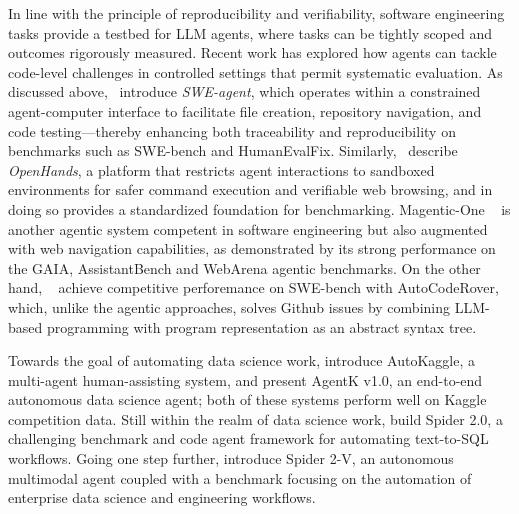 



In line with the principle of reproducibility and verifiability, software engineering tasks provide a testbed for LLM agents, where tasks can be tightly scoped and outcomes rigorously measured. Recent work has explored how agents can tackle code-level challenges in controlled settings that permit systematic evaluation. As discussed above,~\citet{yangSWEagentAgentComputerInterfaces2024} introduce \textit{SWE-agent}, which operates within a constrained agent-computer interface to facilitate file creation, repository navigation, and code testing—thereby enhancing both traceability and reproducibility on benchmarks such as SWE-bench and HumanEvalFix. Similarly,~\citet{wangOpenDevinOpenPlatform2024} describe \textit{OpenHands}, a platform that restricts agent interactions to sandboxed environments for safer command execution and verifiable web browsing, and in doing so provides a standardized foundation for benchmarking. Magentic-One ~\citep{fourney2024magenticonegeneralistmultiagentsolving} is another agentic system competent in software engineering but also augmented with web navigation capabilities, as demonstrated by its strong performance on the GAIA, AssistantBench and WebArena \citep{zhou2023webarena} agentic benchmarks.  On the other hand, ~\citet{zhang2024autocoderover} achieve competitive perforemance on SWE-bench with AutoCodeRover, which, unlike the agentic approaches, solves  Github issues by combining LLM-based programming with program representation as an abstract syntax tree.



Towards the goal of automating data science work, \citet{li2024autokagglemultiagentframeworkautonomous} introduce AutoKaggle, a multi-agent human-assisting system, and \citet{grosnit2024largelanguagemodelsorchestrating} present AgentK v1.0, an end-to-end autonomous data science agent; both of these systems perform well on Kaggle competition data. Still within the realm of data science work, \citet{lei2024spider20evaluatinglanguage} build Spider 2.0, a challenging benchmark and code agent framework for automating text-to-SQL workflows. Going one step further,  \citet{cao2024spider2vfarmultimodalagents} introduce Spider 2-V,  an autonomous multimodal agent   coupled with a benchmark focusing on the automation of enterprise data science and engineering workflows.



